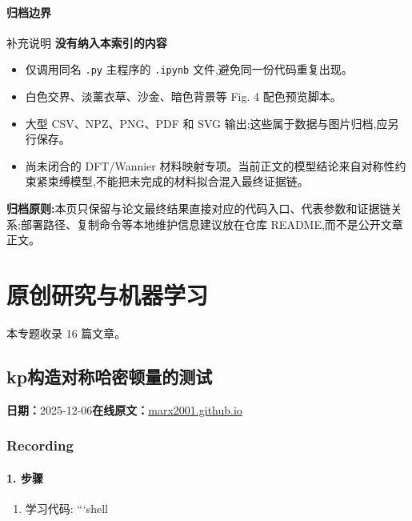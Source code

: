 \documentclass[lang=cn,scheme=chinese,color=blue,device=normal,toc=onecol,math=cm]{elegantbook}
\begin{document}
\subsubsection{归档边界}


\begin{notebox}{补充说明}
 \textbf{没有纳入本索引的内容} 
\begin{itemize}
\item 仅调用同名 \texttt{.py} 主程序的 \texttt{.ipynb} 文件,避免同一份代码重复出现。
\item 白色交界、淡薰衣草、沙金、暗色背景等 Fig. 4 配色预览脚本。
\item 大型 CSV、NPZ、PNG、PDF 和 SVG 输出;这些属于数据与图片归档,应另行保存。
\item 尚未闭合的 DFT/\allowbreak{}Wannier 材料映射专项。当前正文的模型结论来自对称性约束紧束缚模型,不能把未完成的材料拟合混入最终证据链。
\end{itemize}
 
\end{notebox}

 \textbf{归档原则:}本页只保留与论文最终结果直接对应的代码入口、代表参数和证据链关系;部署路径、复制命令等本地维护信息建议放在仓库 README,而不是公开文章正文。 

\chapter{原创研究与机器学习}
\begin{partbox}本专题收录 16 篇文章。\end{partbox}

\section{kp构造对称哈密顿量的测试}
\begin{articlemeta}
\textbf{日期：}2025-12-06\hfill\textbf{在线原文：}\href{https://marx2001.github.io/sci-note\_posts/20251206-kp}{marx2001.github.io}
\end{articlemeta}

\subsection{Recording}


\subsubsection{1. 步骤}


\begin{enumerate}
\item 学习代码: ```shell
\end{enumerate}
\end{document}
